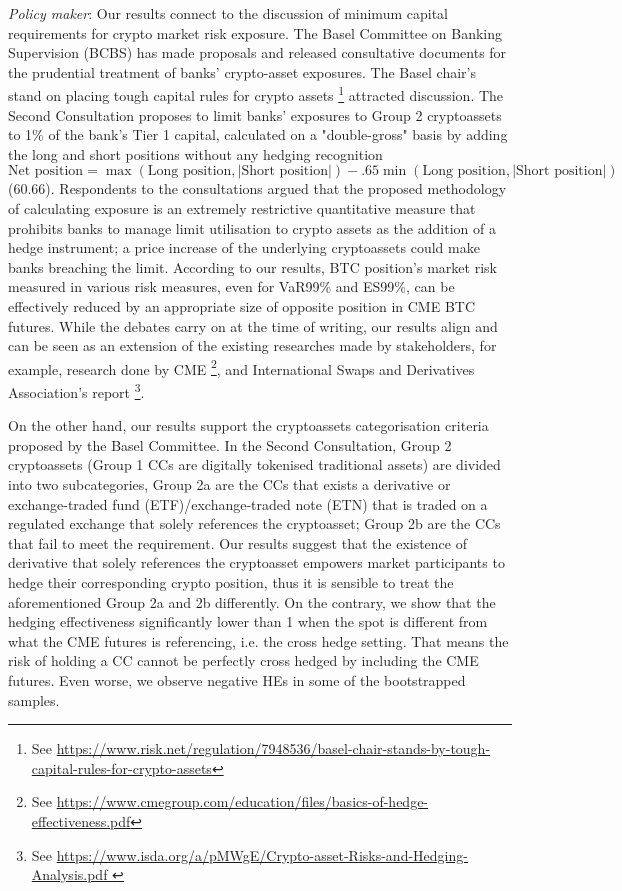 \textit{Policy maker}:
Our results connect to the discussion of minimum capital requirements for crypto market risk exposure.
The Basel Committee on Banking Supervision (BCBS) has made proposals and released consultative documents for the prudential treatment of banks' crypto-asset exposures.
The Basel chair's stand on placing tough capital rules for crypto assets \footnote{See \url{https://www.risk.net/regulation/7948536/basel-chair-stands-by-tough-capital-rules-for-crypto-assets}} attracted discussion.
The Second Consultation proposes to limit banks' exposures to Group 2 cryptoassets to 1\% of the bank's Tier 1 capital,
calculated on a "double-gross" basis by adding the long and short positions without any hedging recognition
$\text{Net position} = \max \left(
\text{Long position}, |\text{Short position}|
\right)
- .65 \min\left(
\text{Long position}, |\text{Short position}|
\right)$ (60.66).
Respondents to the consultations argued that the proposed methodology of calculating exposure is an extremely restrictive quantitative measure that prohibits banks to manage limit utilisation to crypto assets as the addition of a hedge instrument;
a price increase of the underlying cryptoassets could make banks breaching the limit.
According to our results, BTC position's market risk measured in various risk measures,
even for VaR99\% and ES99\%, can be effectively reduced by an appropriate size of opposite position in CME BTC futures.
While the debates carry on at the time of writing, our results align and can be seen as an extension of the existing researches made by stakeholders,
for example, research done by CME \footnote{See \url{https://www.cmegroup.com/education/files/basics-of-hedge-effectiveness.pdf}},
and International Swaps and Derivatives Association's report \footnote{See \url{https://www.isda.org/a/pMWgE/Crypto-asset-Risks-and-Hedging-Analysis.pdf }}.

On the other hand, our results support the cryptoassets categorisation criteria proposed by the Basel Committee.
In the Second Consultation, Group 2 cryptoassets (Group 1 CCs are digitally tokenised traditional assets) are divided into two subcategories,
Group 2a are the CCs that exists a derivative or exchange-traded fund (ETF)/exchange-traded note (ETN) that is traded on a regulated exchange that solely references the cryptoasset;
Group 2b are the CCs that fail to meet the requirement.
Our results suggest that the existence of derivative that solely references the cryptoasset empowers market participants to hedge their corresponding crypto position,
thus it is sensible to treat the aforementioned Group 2a and 2b differently.
On the contrary, we show that the hedging effectiveness significantly lower than 1 when the spot is different from what the CME futures is referencing, i.e. the cross hedge setting.
That means the risk of holding a CC cannot be perfectly cross hedged by including the CME futures.
Even worse, we observe negative HEs in some of the bootstrapped samples.



